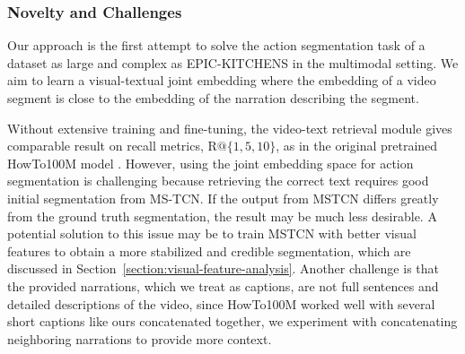 \subsubsection{Novelty and Challenges}
Our approach is the first attempt to solve the action segmentation task of a dataset as large and complex as EPIC-KITCHENS in the multimodal setting. 
We aim to learn a visual-textual joint embedding where the embedding of a video segment is close to the embedding of the narration describing the segment.

Without extensive training and fine-tuning, the video-text retrieval module gives comparable result on recall metrics, R$@\{1,5,10\}$, as in the original pretrained HowTo100M model \cite{miech19howto100m}. However, 
using the joint embedding space for action segmentation is challenging because retrieving the correct text requires good initial segmentation from MS-TCN. If the output from MSTCN differs greatly from the ground truth segmentation, the result may be much less desirable. A potential solution to this issue may be to train MSTCN with better visual features to obtain a more stabilized and credible segmentation, which are discussed in Section~\ref{section:visual-feature-analysis}.
Another challenge is that the provided narrations, which we treat as captions, are not full sentences and detailed descriptions of the video, since HowTo100M \cite{miech19howto100m} worked well with several short captions like ours concatenated together, we experiment with concatenating neighboring narrations to provide more context.

